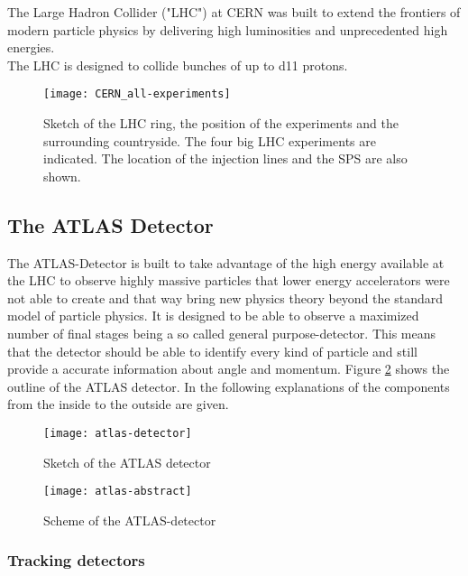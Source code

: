 The Large Hadron Collider ("LHC") at CERN was built to extend the frontiers of modern particle physics by delivering high luminosities and unprecedented high energies.\\
The LHC is designed to collide bunches of up to \num{d11} protons.
\begin{figure}[h]
  \centering
  \texttt{[image: CERN\_all-experiments]}
  \caption[Sketch of the LHC ring, the position of the experiments and
  the surrounding countryside.]{Sketch of the LHC ring, the position
    of the experiments and the surrounding countryside. The four big
    LHC experiments are indicated. The location of the injection lines
    and the SPS are also shown. \cite{atlasfigures}}
  \label{fig:LHC}
\end{figure}


\subsection{The ATLAS Detector}

The ATLAS-Detector is built to take advantage of the high energy available at the LHC to observe highly massive particles that lower energy accelerators were not able to create and that way bring new physics theory beyond the standard model of particle physics.
It is designed to be able to observe a maximized number of final stages being a so called general purpose-detector. This means that the detector should be able to identify every kind of particle and still provide a accurate information about angle and momentum.
Figure \ref{fig:atlas} shows the outline of the ATLAS detector. In the following explanations of the components from the inside to the outside are given.

\begin{figure}[h]
  \centering
  \texttt{[image: atlas-detector]}
  \caption[Sketch of the ATLAS detector]{Sketch of the ATLAS detector \cite{atlasfigures}}
  \label{fig:atlas}
\end{figure}


\begin{figure}[h]
  \centering
  \texttt{[image: atlas-abstract]}
  \caption[Sketch of the transversal section of the ATLAS detector]{Scheme of the ATLAS-detector \cite{atlasfigures}}
  \label{fig:atlas_sketch}
\end{figure}

\subsubsection{Tracking detectors}

